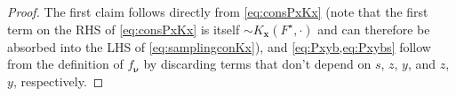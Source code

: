 \documentclass[reqno,draft]{amsart}
\numberwithin{equation}{section}
\theoremstyle{plain}
\theoremstyle{remark}
\newcommand*\diff{\mathop{}\!\mathrm{d}}
\newcommand{\ind}{\mathds{1}}
\newcommand{\fpart}{\Pi} %
\DeclareMathOperator{\dcb}{dec}
\DeclareMathOperator{\dc}{Dec}
\newcommand{\fnu}{f_{\boldsymbol \nu}}
\newcommand{\rs}[1]{\accentset{\circ}{#1}} %
\newcommand{\rsto}[1]{\mathord\downarrow_{#1}}
\begin{document}
\begin{proof}
    The first claim follows directly from \cref{eq:consPxKx} (note that the first term on the RHS of \eqref{eq:consPxKx} is itself $\sim K_{\boldsymbol x}(F^\star,\cdot )$ and can therefore be absorbed into the LHS of \eqref{eq:samplingconKx}), and
    \cref{eq:Pxyb,eq:Pxybs} follow from the definition of $\fnu$ by discarding terms that don't depend on $s$, $z$, $y$, and $z$, $y$, respectively.
\end{proof}
\end{document}
